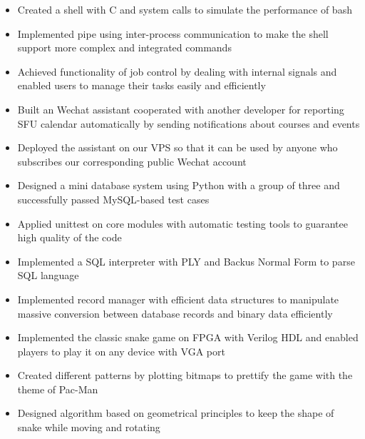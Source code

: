 \documentclass[11pt,a4paper,sans]{moderncv}   %
\begin{document}
{%
\begin{itemize}%
\item Created a shell with C and system calls to simulate the performance of bash%
\item Implemented pipe using inter-process communication to make the shell support more complex and integrated commands
\item Achieved functionality of job control by dealing with internal signals and enabled users to manage their tasks easily and efficiently
\end{itemize}
}


{%
\begin{itemize}%
\item Built an Wechat assistant cooperated with another developer for reporting SFU calendar automatically by sending notifications about courses and events%
\item Deployed the assistant on our VPS so that it can be used by anyone who subscribes our corresponding public Wechat account
\end{itemize}
}

{%
\begin{itemize}%
\item Designed a mini database system using Python with a group of three and successfully passed MySQL-based test cases
%
\item Applied unittest on core modules with automatic testing tools to guarantee high quality of the code
%
\item Implemented a SQL interpreter with PLY and Backus Normal Form to parse SQL language
%
\item Implemented record manager with efficient data structures to manipulate massive conversion between database records and binary data efficiently
\end{itemize}
}

{%
\begin{itemize}%
\item Implemented the classic snake game on FPGA with Verilog HDL and enabled players to play it on any device with VGA port%
\item Created different patterns by plotting bitmaps to prettify the game with the theme of Pac-Man
\item Designed algorithm based on geometrical principles to keep the shape of snake while moving and rotating
\end{itemize}
}
\end{document}
